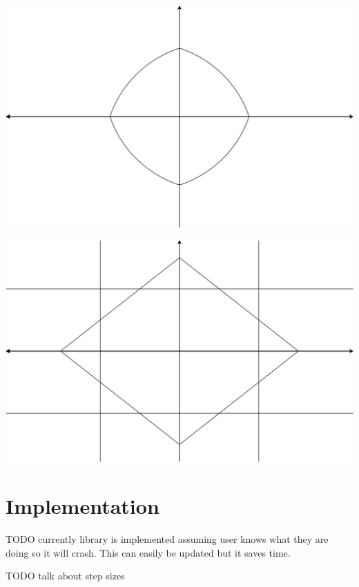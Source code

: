 \documentclass[12pt, a4paper, reqno]{article}
\numberwithin{equation}{section}
\begin{document}
\begin{center}
\begin{minipage}{.5\textwidth}
  \centering
  \includegraphics[width=.9\linewidth]{elnet.pdf}
\end{minipage}%
\begin{minipage}{.5\textwidth}
  \centering
  \includegraphics[width=.9\linewidth]{1andinf.pdf}
\end{minipage}
\end{center}





\section{Implementation}

TODO currently library is implemented assuming user knows what they are doing so it will crash. This can easily be updated but it saves time.

TODO talk about step sizes
\end{document}

